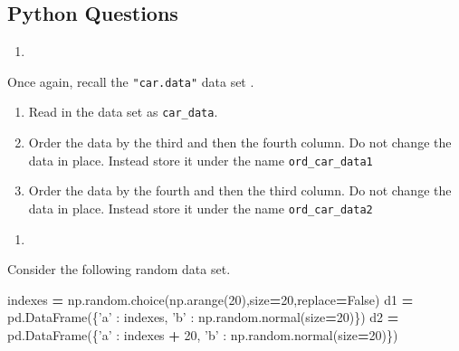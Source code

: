 \documentclass[12pt,krantz2]{krantz}
\makeatletter
\newenvironment{Shaded}{\begin{snugshade}}{\end{snugshade}}
\newcommand{\DecValTok}[1]{\textcolor[rgb]{0.06,0.06,0.06}{#1}}
\newcommand{\NormalTok}[1]{#1}
\newcommand{\OperatorTok}[1]{\textcolor[rgb]{0.43,0.43,0.43}{\textbf{#1}}}
\newcommand{\StringTok}[1]{\textcolor[rgb]{0.5,0.5,0.5}{#1}}
\newcommand{\VariableTok}[1]{\textcolor[rgb]{0,0,0}{#1}}
\providecommand{\tightlist}{%
  \setlength{\itemsep}{0pt}\setlength{\parskip}{0pt}}
\newenvironment{kframe}{%
\medskip{}
\setlength{\fboxsep}{.8em}
 \def\at@end@of@kframe{}%
 \ifinner\ifhmode%
  \def\at@end@of@kframe{\end{minipage}}%
  \begin{minipage}{\columnwidth}%
 \fi\fi%
 \def\FrameCommand##1{\hskip\@totalleftmargin \hskip-\fboxsep
 \colorbox{shadecolor}{##1}\hskip-\fboxsep
     \hskip-\linewidth \hskip-\@totalleftmargin \hskip\columnwidth}%
 \MakeFramed {\advance\hsize-\width
   \@totalleftmargin\z@ \linewidth\hsize
   \@setminipage}}%
 {\par\unskip\endMakeFramed%
 \at@end@of@kframe}
\renewenvironment{Shaded}{\begin{kframe}}{\end{kframe}}
\makeatother
\begin{document}
\hypertarget{python-questions-9}{%
\subsection{Python Questions}\label{python-questions-9}}

\begin{enumerate}
\def\labelenumi{\arabic{enumi}.}
\item
\end{enumerate}

Once again, recall the \texttt{"car.data"} data set \citep{misc_car_evaluation_19}.

\begin{enumerate}
\def\labelenumi{\alph{enumi})}
\tightlist
\item
  Read in the data set as \texttt{car\_data}.
\item
  Order the data by the third and then the fourth column. Do not change the data in place. Instead store it under the name \texttt{ord\_car\_data1}
\item
  Order the data by the fourth and then the third column. Do not change the data in place. Instead store it under the name \texttt{ord\_car\_data2}
\end{enumerate}

\begin{enumerate}
\def\labelenumi{\arabic{enumi}.}
\setcounter{enumi}{1}
\item
\end{enumerate}

Consider the following random data set.

\begin{Shaded}
\begin{Highlighting}[]
\NormalTok{indexes  }\OperatorTok{=}\NormalTok{ np.random.choice(np.arange(}\DecValTok{20}\NormalTok{),size}\OperatorTok{=}\DecValTok{20}\NormalTok{,replace}\OperatorTok{=}\VariableTok{False}\NormalTok{)}
\NormalTok{d1 }\OperatorTok{=}\NormalTok{ pd.DataFrame(\{}\StringTok{'a'}\NormalTok{ : indexes, }
                   \StringTok{'b'}\NormalTok{ : np.random.normal(size}\OperatorTok{=}\DecValTok{20}\NormalTok{)\})}
\NormalTok{d2 }\OperatorTok{=}\NormalTok{ pd.DataFrame(\{}\StringTok{'a'}\NormalTok{ : indexes }\OperatorTok{+} \DecValTok{20}\NormalTok{, }
                   \StringTok{'b'}\NormalTok{ : np.random.normal(size}\OperatorTok{=}\DecValTok{20}\NormalTok{)\})}
\end{Highlighting}
\end{Shaded}
\end{document}
